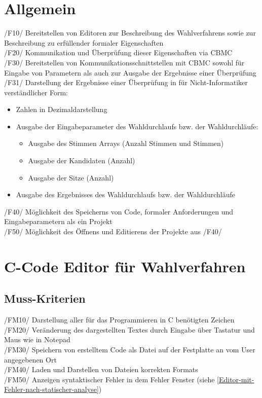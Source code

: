 \documentclass[a4paper]{scrreprt}
\begin{document}
\section{Allgemein}
/F10/ Bereitstellen von Editoren zur Beschreibung des Wahlverfahrens sowie zur Beschreibung zu erfüllender formaler Eigenschaften \\
/F20/ Kommunikation und Überprüfung dieser Eigenschaften via \ac{CBMC} \\
/F30/ Bereitstellen von Kommunikationsschnittstellen mit \ac{CBMC} sowohl für Eingabe von Parametern als auch zur Ausgabe der Ergebnisse einer Überprüfung \\
/F31/ Darstellung der Ergebnisse einer Überprüfung in für Nicht-Informatiker verständlicher Form:
\begin{itemize}
\item Zahlen in Dezimaldarstellung
\item Ausgabe der Eingabeparameter des Wahldurchlaufs bzw. der Wahldurchläufe:
\begin{itemize}
\item Ausgabe des Stimmen Arrays (Anzahl Stimmen und Stimmen) 
\item Ausgabe der Kandidaten (Anzahl)
\item Ausgabe der Sitze (Anzahl)
\end{itemize}
\item Ausgabe des Ergebnisses des Wahldurchlaufs bzw. der Wahldurchläufe
\end{itemize} 
/F40/ Möglichkeit des Speicherns von Code, formaler Anforderungen und Eingabeparametern als ein Projekt \\
/F50/ Möglichkeit des Öffnens und Editierens der Projekte aus /F40/

\section{C-Code Editor für Wahlverfahren}
\subsection{Muss-Kriterien}
/FM10/ Darstellung aller für das Programmieren in C benötigten Zeichen \\
/FM20/ Veränderung des dargestellten Textes durch Eingabe über Tastatur und Maus wie in Notepad \\
/FM30/ Speichern von erstelltem Code als Datei auf der Festplatte an vom User angegebenen Ort \\
/FM40/ Laden und Darstellen von Dateien korrekten Formats \\
/FM50/ Anzeigen syntaktischer Fehler in dem Fehler Fenster (siehe \ref{Editor-mit-Fehler-nach-statischer-analyse})
\end{document}
